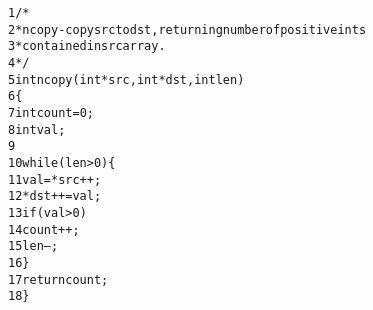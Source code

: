 \begin{alltt}
{\scriptsize   1} /*
{\scriptsize   2}  * ncopy - copy src to dst, returning number of positive ints
{\scriptsize   3}  * contained in src array.
{\scriptsize   4}  */
{\scriptsize   5} int ncopy(int *src, int *dst, int len)
{\scriptsize   6} \verb:{:
{\scriptsize   7}     int count = 0;
{\scriptsize   8}     int val;
{\scriptsize   9} 
{\scriptsize  10}     while (len > 0) \verb:{:
{\scriptsize  11}         val = *src++;
{\scriptsize  12}         *dst++ = val;
{\scriptsize  13}         if (val > 0)
{\scriptsize  14}             count++;
{\scriptsize  15}         len--;
{\scriptsize  16}     \verb:}:
{\scriptsize  17}     return count;
{\scriptsize  18} \verb:}:
\end{alltt}
